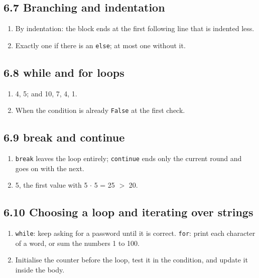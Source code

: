 \documentclass[11pt]{article}
\begin{document}
\begin{keepsection}\subsection{6.7 Branching and indentation}

\begin{enumerate}
\item By indentation: the block ends at the first following line that is indented less.
\item Exactly one if there is an \texttt{else}; at most one without it.
\end{enumerate}

\end{keepsection}
\begin{keepsection}\subsection{6.8 while and for loops}

\begin{enumerate}
\item 4, 5; and 10, 7, 4, 1.
\item When the condition is already \texttt{False} at the first check.
\end{enumerate}

\end{keepsection}
\begin{keepsection}\subsection{6.9 break and continue}

\begin{enumerate}
\item \texttt{break} leaves the loop entirely; \texttt{continue} ends only the current round and goes on with the next.
\item 5, the first value with 5 \ensuremath{\cdot} 5 = 25 \ensuremath{>} 20.
\end{enumerate}

\end{keepsection}
\begin{keepsection}\subsection{6.10 Choosing a loop and iterating over strings}

\begin{enumerate}
\item \texttt{while}: keep asking for a password until it is correct. \texttt{for}: print each character of a word, or sum the numbers 1 to 100.
\item Initialise the counter before the loop, test it in the condition, and update it inside the body.
\end{enumerate}

\end{keepsection}
\end{document}
